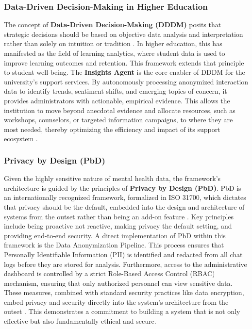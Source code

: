 \subsubsection{Data-Driven Decision-Making in Higher Education}
The concept of \textbf{Data-Driven Decision-Making (DDDM)} posits that strategic decisions should be based on objective data analysis and interpretation rather than solely on intuition or tradition \cite{williams2022datadrivenhe, lyon2020datadrivenuniversity}. In higher education, this has manifested as the field of learning analytics, where student data is used to improve learning outcomes and retention. This framework extends that principle to student well-being. The \textbf{Insights Agent} is the core enabler of DDDM for the university's support services. By autonomously processing anonymized interaction data to identify trends, sentiment shifts, and emerging topics of concern, it provides administrators with actionable, empirical evidence. This allows the institution to move beyond anecdotal evidence and allocate resources, such as workshops, counselors, or targeted information campaigns, to where they are most needed, thereby optimizing the efficiency and impact of its support ecosystem \cite{popoola2025privacyawareframework}.

\subsubsection{Privacy by Design (PbD)}
Given the highly sensitive nature of mental health data, the framework's architecture is guided by the principles of \textbf{Privacy by Design (PbD)}. PbD is an internationally recognized framework, formalized in ISO 31700, which dictates that privacy should be the default, embedded into the design and architecture of systems from the outset rather than being an add-on feature \cite{guarda2024certificationsprivacy,atabey2024ethicsinedtech}. Key principles include being proactive not reactive, making privacy the default setting, and providing end-to-end security. A direct implementation of PbD within this framework is the Data Anonymization Pipeline. This process ensures that Personally Identifiable Information (PII) is identified and redacted from all chat logs before they are stored for analysis. Furthermore, access to the administrative dashboard is controlled by a strict Role-Based Access Control (RBAC) mechanism, ensuring that only authorized personnel can view sensitive data. These measures, combined with standard security practices like data encryption, embed privacy and security directly into the system's architecture from the outset \cite{popoola2025privacyawareframework, guarda2024certificationsprivacy}. This demonstrates a commitment to building a system that is not only effective but also fundamentally ethical and secure.

